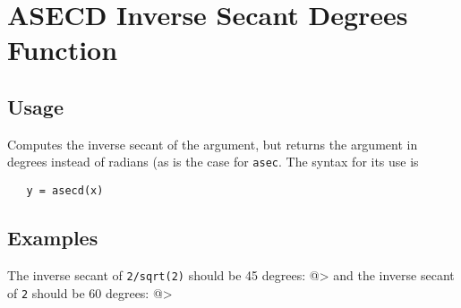 \section{ASECD Inverse Secant Degrees Function}

\subsection{Usage}

Computes the inverse secant of the argument, but returns
the argument in degrees instead of radians (as is the case
for \verb|asec|. The syntax for its use is
\begin{verbatim}
   y = asecd(x)
\end{verbatim}
\subsection{Examples}

The inverse secant of \verb|2/sqrt(2)| should be 45 degrees:
@>
and the inverse secant of \verb|2| should be 60 degrees:
@>
